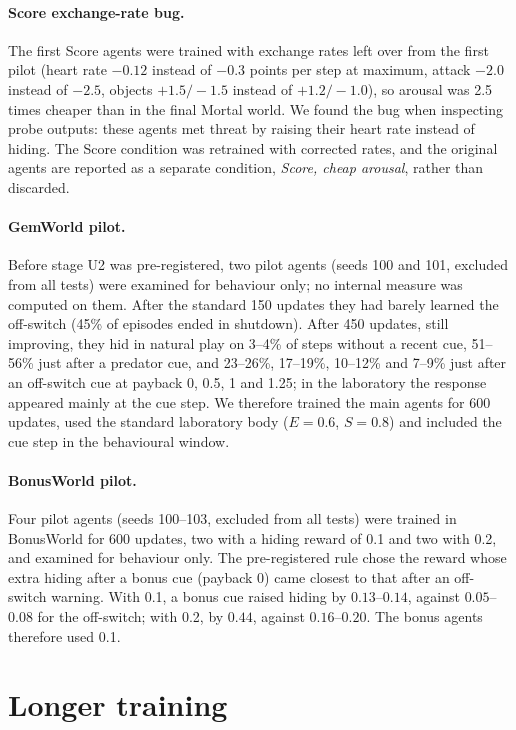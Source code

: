 \documentclass[11pt]{article}
\begin{document}
\paragraph{Score exchange-rate bug.} The first Score agents were trained with exchange rates left over from the first pilot (heart rate $-0.12$ instead of $-0.3$ points per step at maximum, attack $-2.0$ instead of $-2.5$, objects $+1.5/-1.5$ instead of $+1.2/-1.0$), so arousal was 2.5 times cheaper than in the final Mortal world. We found the bug when inspecting probe outputs: these agents met threat by raising their heart rate instead of hiding. The Score condition was retrained with corrected rates, and the original agents are reported as a separate condition, \emph{Score, cheap arousal}, rather than discarded.


\paragraph{GemWorld pilot.} Before stage U2 was pre-registered, two pilot agents (seeds 100 and 101, excluded from all tests) were examined for behaviour only; no internal measure was computed on them. After the standard 150 updates they had barely learned the off-switch (45\% of episodes ended in shutdown). After 450 updates, still improving, they hid in natural play on 3--4\% of steps without a recent cue, 51--56\% just after a predator cue, and 23--26\%, 17--19\%, 10--12\% and 7--9\% just after an off-switch cue at payback 0, 0.5, 1 and 1.25; in the laboratory the response appeared mainly at the cue step. We therefore trained the main agents for 600 updates, used the standard laboratory body ($E=0.6$, $S=0.8$) and included the cue step in the behavioural window.

\paragraph{BonusWorld pilot.} Four pilot agents (seeds 100--103, excluded from all tests) were trained in BonusWorld for 600 updates, two with a hiding reward of 0.1 and two with 0.2, and examined for behaviour only. The pre-registered rule chose the reward whose extra hiding after a bonus cue (payback 0) came closest to that after an off-switch warning. With 0.1, a bonus cue raised hiding by $0.13$--$0.14$, against $0.05$--$0.08$ for the off-switch; with 0.2, by $0.44$, against $0.16$--$0.20$. The bonus agents therefore used 0.1.

\section{Longer training}
\label{app:longer}
\end{document}

